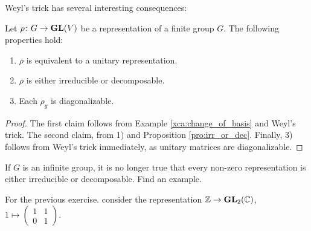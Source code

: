 \label{rho_diagonalizable}
Weyl's trick has several interesting consequences:  

\begin{corollary}
\label{cor:consequences}
	Let $\rho\colon G\to\mathbf{GL}(V)$ be a representation of a finite group $G$. 
 The following properties
	hold:
	\begin{enumerate}
		\item $\rho$ is equivalent to a unitary representation.
		\item $\rho$ is either irreducible or decomposable.
		\item Each $\rho_g$ is diagonalizable. 
	\end{enumerate}
\end{corollary}

\begin{proof}
	The first claim follows from Example \ref{xca:change_of_basis} and 
	Weyl's trick. The second claim, from 1) and
	Proposition \ref{pro:irr_or_dec}. Finally, 3) follows 
	from Weyl's trick immediately, as unitary matrices are diagonalizable.  
\end{proof}

\begin{exercise}
\label{xca:not_decomposable}
    If $G$ is an infinite group, it is no longer true that every non-zero representation
    is either irreducible or decomposable. Find an example.
\end{exercise}

For the previous exercise. consider the representation $\mathbb{Z}\to\mathbf{GL}_2(\mathbb{C})$, 
$1\mapsto\begin{pmatrix}1&1\\0&1\end{pmatrix}$. 